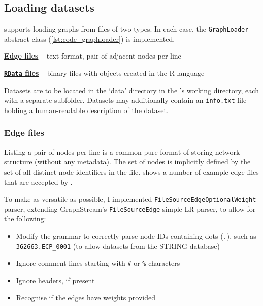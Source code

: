 \subsection{Loading datasets}

\graffs supports loading graphs from files of two types.
In each case, the \texttt{GraphLoader} abstract class (\autoref{lst:code_graphloader}) is implemented.
\begin{description}[itemsep=\zerospace]
    \item \hyperref[sec:edge_files]{\textbf{Edge files}} -- text format, pair of adjacent nodes per line
    \item \hyperref[sec:rdata_files]{\textbf{\texttt{RData} files}} -- binary files with objects created in the R language~\cite{RCoreTeamLanguageEnvironmentStatistical2009}
\end{description}

Datasets are to be located in the `data' directory in the \graffs's working directory, each with a separate subfolder.
Datasets may additionally contain an \texttt{info.txt} file holding a human-readable description of the dataset.



\vspace*{-0.5mm}
\subsubsection*{Edge files}\label{sec:edge_files}

Listing a pair of nodes per line is a common pure format of storing network structure (without any metadata).
The set of nodes is implicitly defined by the set of all distinct node identifiers in the file.
 shows a number of example edge files that are accepted by \graffs.



To make \graffs as versatile as possible, I implemented \texttt{FileSourceEdgeOptionalWeight} parser, extending GraphStream's \texttt{FileSourceEdge} simple LR parser, to allow for the following:
\begin{itemize}[topsep=5pt,itemsep=-2pt]
    \item Modify the grammar to correctly parse node IDs containing dots (\texttt{.}), such as \texttt{362663.ECP\_0001} (to allow datasets from the STRING database)
    \item Ignore comment lines starting with \texttt{\#} or \texttt{\%} characters
    \item Ignore headers, if present
    \item Recognise if the edges have weights provided
\end{itemize}

